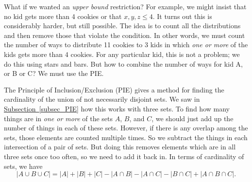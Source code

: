 \documentclass[10pt,]{book}
\theoremstyle{plain}
\theoremstyle{definition}
\theoremstyle{definition}
\theoremstyle{definition}
\numberwithin{equation}{chapter}
\begin{document}
      What if we wanted an \emph{upper bound} restriction? For example, we might insist that no kid gets more than 4 cookies or that \(x, y, z \le 4\). It turns out this is considerably harder, but still possible. The idea is to count all the distributions and then remove those that violate the condition. In other words, we must count the number of ways to distribute 11 cookies to 3 kids in which \emph{one or more} of the kids gets more than 4 cookies. For any particular kid, this is not a problem; we do this using stars and bars. But how to combine the number of ways for kid A, or B or C? We must use the PIE.
\par

      The Principle of Inclusion/Exclusion (PIE) gives a method for finding the cardinality of the union of not necessarily disjoint sets. We saw in
      \hyperref[subsec_PIE]{Subsection~\ref{subsec_PIE}} how this works with three sets. To find how many things are in \emph{one or more} of the sets \(A\), \(B\), and \(C\), we should just add up the number of things in each of these sets. However, if there is any overlap among the sets, those elements are counted multiple times. So we subtract the things in each intersection of a pair of sets. But doing this removes elements which are in all three sets once too often, so we need to add it back in. In terms of cardinality of sets, we have
      \begin{equation*}
        |A \cup B \cup C| = |A| + |B| + |C| - |A \cap B| - |A \cap C| - |B \cap C| + |A\cap B \cap C|.
      \end{equation*}
\end{document}
